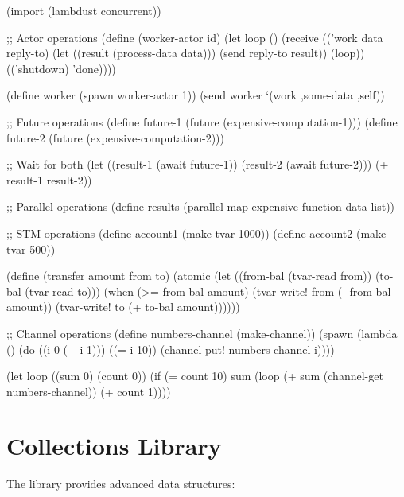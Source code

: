 \begin{example}
\begin{lambdustcode}
(import (lambdust concurrent))

;; Actor operations
(define (worker-actor id)
  (let loop ()
    (receive
      (('work data reply-to)
       (let ((result (process-data data)))
         (send reply-to result))
       (loop))
      (('shutdown) 'done))))

(define worker (spawn worker-actor 1))
(send worker `(work ,some-data ,self))

;; Future operations
(define future-1 (future (expensive-computation-1)))
(define future-2 (future (expensive-computation-2)))

;; Wait for both
(let ((result-1 (await future-1))
      (result-2 (await future-2)))
  (+ result-1 result-2))

;; Parallel operations
(define results (parallel-map expensive-function data-list))

;; STM operations
(define account1 (make-tvar 1000))
(define account2 (make-tvar 500))

(define (transfer amount from to)
  (atomic
    (let ((from-bal (tvar-read from))
          (to-bal (tvar-read to)))
      (when (>= from-bal amount)
        (tvar-write! from (- from-bal amount))
        (tvar-write! to (+ to-bal amount))))))

;; Channel operations
(define numbers-channel (make-channel))
(spawn (lambda () 
         (do ((i 0 (+ i 1))) ((= i 10))
           (channel-put! numbers-channel i))))

(let loop ((sum 0) (count 0))
  (if (= count 10)
      sum
      (loop (+ sum (channel-get numbers-channel)) (+ count 1))))
\end{lambdustcode}
\end{example}

\section{Collections Library}
\label{sec:collections-library}


The  library provides advanced data structures:

